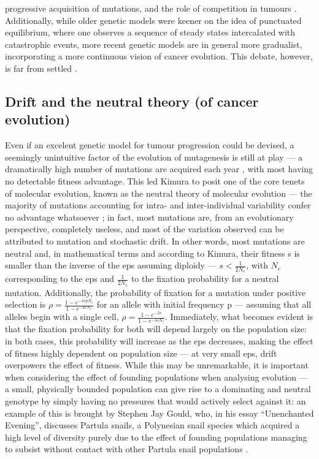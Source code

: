 progressive acquisition of mutations, and the role of competition in tumours \cite{Cannataro2018-ye,Schwartz2017-hg}. Additionally, while older genetic models were keener on the idea of punctuated equilibrium, where one observes a sequence of steady states intercalated with catastrophic events, more recent genetic models are in general more gradualist, incorporating a more continuous vision of cancer evolution. This debate, however, is far from settled \cite{Beerenwinkel2015-xr,Sterelny2007-kp}.

\subsection{Drift and the neutral theory (of cancer evolution)}

Even if an excelent genetic model for tumour progression could be devised, a seemingly unintuitive factor of the evolution of mutagenesis is still at play --- a dramatically high number of mutations are acquired each year \cite{Kimura1968-xd}, with most having no detectable fitness advantage. This led Kimura to posit one of the core tenets of molecular evolution, known as the neutral theory of molecular evolution --- the majority of mutations accounting for intra- and inter-individual variability confer no advantage whatsoever \cite{Kimura1979-ps}; in fact, most mutations are, from an evolutionary perspective, completely useless, and most of the variation observed can be attributed to mutation and stochastic drift. In other words, most mutations are neutral and, in mathematical terms and according to Kimura, their fitness s is smaller than the inverse of the \ac{eps} assuming diploidy --- $s<\frac{1}{2N_e}$, with $N_e$ corresponding to the \ac{eps} and $\frac{1}{2N_e}$ to the fixation probability for a neutral mutation. Additionally, the probability of fixation for a mutation under positive selection is $\rho = \frac{1-e^{-4spN_e}}{1-e^{-4sN_e}}$ for an allele with initial frequency p \cite{Kimura1962-df} --- assuming that all alleles begin with a single cell, $\rho = \frac{1-e^{-2s}}{1-e^{-4sN_e}}$. Immediately, what becomes evident is that the fixation probability for both will depend largely on the population size: in both cases, this probability will increase as the \ac{eps} decreases, making the effect of fitness highly dependent on population size --- at very small \ac{eps}, drift overpowers the effect of fitness. While this may be unremarkable, it is important when considering the effect of founding populations when analysing evolution --- a small, physically bounded population can give rise to a dominating and neutral genotype by simply having no pressures that would actively select against it: an example of this is brought by Stephen Jay Gould, who, in his essay “Unenchanted Evening”, discusses Partula snails, a Polynesian snail species which acquired a high level of diversity purely due to the effect of founding populations managing to subsist without contact with other Partula snail populations \cite{Gould1995-yr}.

